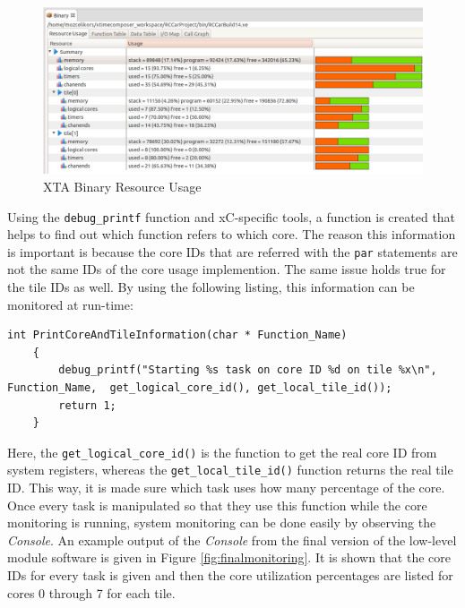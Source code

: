 \begin{figure}[!ht]
	\centering
	\captionsetup{justification=centering}
	\includegraphics[width=\textwidth]{content/images/binaryresourceusage.png}
	\caption{XTA Binary Resource Usage}
	\label{fig:binaryresourceusage}
\end{figure}

Using the \texttt{debug\texttt{\_}printf} function and xC-specific tools, a function is created that helps to find out which function refers to which core. The reason this information is important is because the core IDs that are referred with the \texttt{par} statements are not the same IDs of the core usage implemention. The same issue holds true for the tile IDs as well. By using the following listing, this information can be monitored at run-time:

\newpage\begin{lstlisting}[style=xc]
	int PrintCoreAndTileInformation(char * Function_Name)
	{
		debug_printf("Starting %s task on core ID %d on tile %x\n", Function_Name, 	get_logical_core_id(), get_local_tile_id());
		return 1;
	}
\end{lstlisting}

Here, the \texttt{get\texttt{\_}logical\texttt{\_}core\texttt{\_}id()} is the function to get the real core ID from system registers, whereas the \texttt{get\texttt{\_}local\texttt{\_}tile\texttt{\_}id()} function returns the real tile ID. This way, it is made sure which task uses how many percentage of the core. Once every task is manipulated so that they use this function while the core monitoring is running, system monitoring can be done easily by observing the \textit{Console}. An example output of the \textit{Console} from the final version of the low-level module software is given in Figure \ref{fig:finalmonitoring}. It is shown that the core IDs for every task is given and then the core utilization percentages are listed for cores 0 through 7 for each tile.


